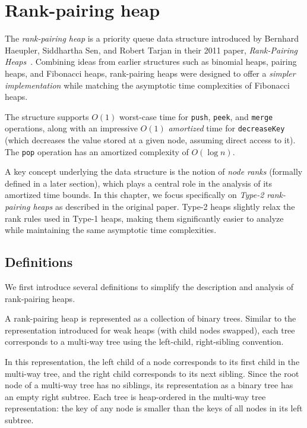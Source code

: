 \section{Rank-pairing heap}

The \emph{rank-pairing heap} is a priority queue data structure introduced by Bernhard Haeupler, Siddhartha Sen, and Robert Tarjan in their 2011 paper, \emph{Rank-Pairing Heaps}~\cite{HaeuplerSenTarjan2011}. Combining ideas from earlier structures such as binomial heaps, pairing heaps, and Fibonacci heaps, rank-pairing heaps were designed to offer a \emph{simpler implementation} while matching the asymptotic time complexities of Fibonacci heaps.

The structure supports \(O(1)\) worst-case time for \texttt{push}, \texttt{peek}, and \texttt{merge} operations, along with an impressive \(O(1)\) \emph{amortized} time for \texttt{decreaseKey} (which decreases the value stored at a given node, assuming direct access to it). The \texttt{pop} operation has an amortized complexity of \(O(\log n)\).

A key concept underlying the data structure is the notion of \emph{node ranks} (formally defined in a later section), which plays a central role in the analysis of its amortized time bounds. In this chapter, we focus specifically on \emph{Type-2 rank-pairing heaps} as described in the original paper. Type-2 heaps slightly relax the rank rules used in Type-1 heaps, making them significantly easier to analyze while maintaining the same asymptotic time complexities.

\subsection{Definitions}

We first introduce several definitions to simplify the description and analysis of rank-pairing heaps.

A rank-pairing heap is represented as a collection of binary trees. Similar to the representation introduced for weak heaps (with child nodes swapped), each tree corresponds to a multi-way tree using the left-child, right-sibling convention.

In this representation, the left child of a node corresponds to its first child in the multi-way tree, and the right child corresponds to its next sibling. Since the root node of a multi-way tree has no siblings, its representation as a binary tree has an empty right subtree. Each tree is heap-ordered in the multi-way tree representation: the key of any node is smaller than the keys of all nodes in its left subtree.


